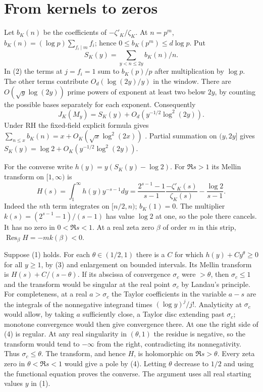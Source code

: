 \documentclass[11pt]{article}
\DeclareMathOperator{\Res}{Res}
\begin{document}
\newpage
\section*{From kernels to zeros}
Let $b_K(n)$ be the coefficients of $-\zeta'_K/\zeta_K$.
At $n=p^m$, $b_K(n)=(\log p)\sum_{f_i\mid m}f_i$; hence
$0\le b_K(p^m)\le d\log p$. Put
\[
 S_K(y)=\sum_{y<n\le2y} b_K(n)/n .
\]
In (2) the terms at $j=f_i=1$ sum to $b_K(p)/p$ after multiplication
by $\log p$. The other terms contribute $O_d(\log(2y)/y)$ in the window.
There are $O(\sqrt y\log(2y))$ prime powers of exponent at least two
below $2y$, by counting the possible bases separately for each exponent.
Consequently
\[
 J_K(M_y)= S_K(y)+O_d(y^{-1/2}\log^2(2y)).              \tag{3}
\]
Under RH the fixed-field explicit formula gives
$\sum_{n\le x}b_K(n)=x+O_K(\sqrt x\log^2(2x))$
\cite{gm}. Partial summation on $(y,2y]$ gives
$S_K(y)=\log 2+O_K(y^{-1/2}\log^2(2y))$.

For the converse write $h(y)=y(S_K(y)-\log 2)$. For $\Re s>1$ its
Mellin transform on $[1,\infty)$ is
\[
 H(s)=\int_1^\infty h(y)y^{-s-1}dy
 =\frac{2^{s-1}-1}{s-1}\frac{-\zeta'_K(s)}{\zeta_K(s)}
     -\frac{\log 2}{s-1}.                               \tag{4}
\]
Indeed the $n$th term integrates on $[n/2,n)$; $b_K(1)=0$.
The multiplier $k(s)=(2^{s-1}-1)/(s-1)$ has value $\log2$ at one,
so the pole there cancels. It has no zero in $0<\Re s<1$.
At a real zeta zero $\beta$ of order $m$ in this strip,
$\Res_\beta H=-m k(\beta)<0$.

Suppose (1) holds. For each $\theta\in(1/2,1)$ there is a $C$ for
which $h(y)+C y^\theta\ge0$ for all $y\ge1$, by (3) and enlargement
on bounded intervals. Its Mellin transform is
$H(s)+C/(s-\theta)$. If its abscissa of convergence $\sigma_c$
were $>\theta$, then $\sigma_c\le1$ and the transform would be
singular at the real point $\sigma_c$ by Landau's principle.
For completeness, at a real $a>\sigma_c$ the Taylor coefficients in
the variable $a-s$ are the integrals of the nonnegative integrand
times $(\log y)^j/j!$. Analyticity at $\sigma_c$ would allow, by
taking $a$ sufficiently close, a Taylor disc extending past $\sigma_c$;
monotone convergence would then give convergence there.
At one the right side of (4) is regular. At any real singularity in
$(\theta,1)$ the residue is negative, so the transform would tend to
$-\infty$ from the right, contradicting its nonnegativity.
Thus $\sigma_c\le\theta$. The transform, and hence $H$, is
holomorphic on $\Re s>\theta$. Every zeta zero in $\theta<\Re s<1$
would give a pole by (4). Letting $\theta$ decrease to $1/2$ and using
the functional equation proves the converse. The argument uses all
real starting values $y$ in (1).
\end{document}
